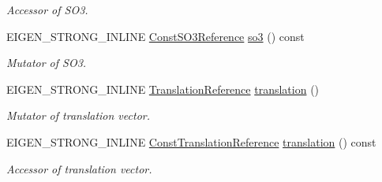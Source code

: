 \begin{DoxyCompactItemize}
\begin{DoxyCompactList}\small\item\em Accessor of S\+O3. \end{DoxyCompactList}\item 
E\+I\+G\+E\+N\+\_\+\+S\+T\+R\+O\+N\+G\+\_\+\+I\+N\+L\+I\+NE \hyperlink{class_sophus_1_1_s_e3_group_a448cfe0c4de4a21fe0993472dfc4b981}{Const\+S\+O3\+Reference} \hyperlink{class_sophus_1_1_s_e3_group_a3bc39feddabf5114bacfe1198786422a}{so3} () const \hypertarget{class_sophus_1_1_s_e3_group_a3bc39feddabf5114bacfe1198786422a}{}\label{class_sophus_1_1_s_e3_group_a3bc39feddabf5114bacfe1198786422a}

\begin{DoxyCompactList}\small\item\em Mutator of S\+O3. \end{DoxyCompactList}\item 
E\+I\+G\+E\+N\+\_\+\+S\+T\+R\+O\+N\+G\+\_\+\+I\+N\+L\+I\+NE \hyperlink{class_sophus_1_1_s_e3_group_aecdd5e06df99e50282dbef24632ec622}{Translation\+Reference} \hyperlink{class_sophus_1_1_s_e3_group_a1bfd300de4529a2f6ba0ff5baecea98e}{translation} ()\hypertarget{class_sophus_1_1_s_e3_group_a1bfd300de4529a2f6ba0ff5baecea98e}{}\label{class_sophus_1_1_s_e3_group_a1bfd300de4529a2f6ba0ff5baecea98e}

\begin{DoxyCompactList}\small\item\em Mutator of translation vector. \end{DoxyCompactList}\item 
E\+I\+G\+E\+N\+\_\+\+S\+T\+R\+O\+N\+G\+\_\+\+I\+N\+L\+I\+NE \hyperlink{class_sophus_1_1_s_e3_group_a285d764bd862286f24c8fcde6063b30f}{Const\+Translation\+Reference} \hyperlink{class_sophus_1_1_s_e3_group_a73c63d84058cb4b7d4fc4f35d35f9ce7}{translation} () const \hypertarget{class_sophus_1_1_s_e3_group_a73c63d84058cb4b7d4fc4f35d35f9ce7}{}\label{class_sophus_1_1_s_e3_group_a73c63d84058cb4b7d4fc4f35d35f9ce7}

\begin{DoxyCompactList}\small\item\em Accessor of translation vector. \end{DoxyCompactList}\end{DoxyCompactItemize}

